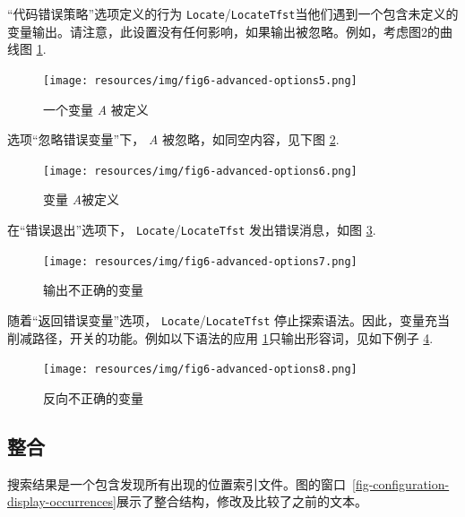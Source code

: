 \bigskip
\noindent “代码错误策略”选项定义的行为
\verb+Locate+/\verb+LocateTfst+当他们遇到一个包含未定义的变量输出。请注意，此设置没有任何影响，如果输出被忽略。例如，考虑图2的曲线图
\ref{fig6-advanced-options5}. 

\bigskip
\begin{figure}[!h]
\begin{center}
\texttt{[image: resources/img/fig6-advanced-options5.png]}
\caption{一个变量 \textit{A} 被定义
\label{fig6-advanced-options5}}
\end{center}
\end{figure}

\noindent 选项“忽略错误变量”下， \textit{A} 被忽略，如同空内容，见下图
\ref{fig6-advanced-options6}. 

\bigskip
\begin{figure}[!h]
\begin{center}
\texttt{[image: resources/img/fig6-advanced-options6.png]}
\caption{变量 \textit{A}被定义
\label{fig6-advanced-options6}}
\end{center}
\end{figure}


\noindent 在“错误退出”选项下， \verb+Locate+/\verb+LocateTfst+
发出错误消息，如图 \ref{fig6-advanced-options7}.

\bigskip
\begin{figure}[!h]
\begin{center}
\texttt{[image: resources/img/fig6-advanced-options7.png]}
\caption{输出不正确的变量\label{fig6-advanced-options7}}
\end{center}
\end{figure}

\noindent 随着“返回错误变量”选项，
\verb+Locate+/\verb+LocateTfst+ 停止探索语法。因此，变量充当削减路径，开关的功能。例如以下语法的应用
\ref{fig6-advanced-options5}只输出形容词，见如下例子 \ref{fig6-advanced-options8}. 

\bigskip
\begin{figure}[!h]
\begin{center}
\texttt{[image: resources/img/fig6-advanced-options8.png]}
\caption{反向不正确的变量\label{fig6-advanced-options8}}
\end{center}
\end{figure}



\subsection{整合}
搜索结果是一个包含发现所有出现的位置索引文件。图的窗口~\ref{fig-configuration-display-occurrences}展示了整合结构，修改及比较了之前的文本。



